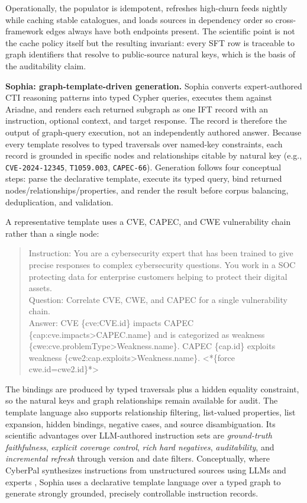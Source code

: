 \documentclass[conference]{IEEEtran}
\providecommand{\hfid}[1]{{\small\nolinkurl{#1}}}
\begin{document}
Operationally, the populator is idempotent, refreshes high-churn feeds nightly while caching stable catalogues, and loads sources in dependency order so cross-framework edges always have both endpoints present. The scientific point is not the cache policy itself but the resulting invariant: every SFT row is traceable to graph identifiers that resolve to public-source natural keys, which is the basis of the auditability claim.

\textbf{Sophia: graph-template-driven generation.} Sophia converts expert-authored CTI reasoning patterns into typed Cypher queries, executes them against Ariadne, and renders each returned subgraph as one IFT record with an instruction, optional context, and target response. The record is therefore the output of graph-query execution, not an independently authored answer. Because every template resolves to typed traversals over named-key constraints, each record is grounded in specific nodes and relationships citable by natural key (e.g., \hfid{CVE-2024-12345}, \texttt{T1059.003}, \hfid{CAPEC-66}). Generation follows four conceptual steps: parse the declarative template, execute its typed query, bind returned nodes/relationships/properties, and render the result before corpus balancing, deduplication, and validation.

A representative template uses a CVE, CAPEC, and CWE vulnerability chain rather than a single node:

\begin{quote}\scriptsize\ttfamily\sloppy\setlength{\rightskip}{0pt plus 2em}\noindent
Instruction: You are a cybersecurity expert that has been trained to give precise responses to complex cybersecurity questions. You work in a SOC protecting data for enterprise customers helping to protect their digital assets.\\
Question: Correlate CVE, CWE, and CAPEC for a single vulnerability chain.\\
Answer: CVE \{cve:CVE.id\} impacts CAPEC \{cap:cve.impacts\textgreater{}CAPEC.name\} and is categorized as weakness \{cwe:cve.problemType\textgreater{}Weakness.name\}. CAPEC \{cap.id\} exploits weakness \{cwe2:cap.exploits\textgreater{}Weakness.name\}. \textless{}*\{force cwe.id=cwe2.id\}*\textgreater{}
\end{quote}

\noindent The bindings are produced by typed traversals plus a hidden equality constraint, so the natural keys and graph relationships remain available for audit. The template language also supports relationship filtering, list-valued properties, list expansion, hidden bindings, negative cases, and source disambiguation. Its scientific advantages over LLM-authored instruction sets are \emph{ground-truth faithfulness}, \emph{explicit coverage control}, \emph{rich hard negatives}, \emph{auditability}, and \emph{incremental refresh} through version and date filters. Conceptually, where CyberPal synthesizes instructions from unstructured sources using LLMs and experts \cite{levi2024cyberpal,levi2025toward}, Sophia uses a declarative template language over a typed graph to generate strongly grounded, precisely controllable instruction records.
\end{document}
